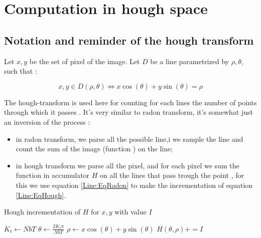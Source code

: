 
\section{Computation in hough space}


\subsection{Notation and reminder of the hough transform}

Let $x,y$  be the set of  pixel of the image.  Let $D$ be a line parametrized
by $\rho, \theta$,  such that :

\begin{equation}
     x,y \in D(\rho,\theta)   \Leftrightarrow  x \cos (\theta) + y \sin (\theta) = \rho  \label{Line:EqRadon}
\end{equation}

The hough-transform is used here for counting for each lines 
the number of points through which it passes . It's very similar to radon
transform, it's somewhat just an inversion of  the process :

\begin{itemize}
    \item in radon transform, we parse all the possible line,i we sample the  line
          and count the sum of the image (function ) on the line;

    \item in hough transform we parse all the pixel, and for each pixel we
          sum the function in accumulator $H$  on all the lines that pass trough the point ,
          for this we use equation \ref{Line:EqRadon} to make the incrementation
          of equation \ref{Line:EqHough}.
         
\end{itemize}

\begin{algorithm}
\caption{Hough incrementation of $H$  for $x,y$ with value $I$}\label{alg:hough}
\begin{algorithmic}
\State $K_t \gets NbT$ 
    \State $\theta  \gets  \frac{2 K_t \pi}{NbT} $
    \State $\rho \gets  x \cos(\theta) + y \sin(\theta)  $  
    \State $H(\theta,\rho) += I$
\EndWhile
\end{algorithmic}
\end{algorithm}


